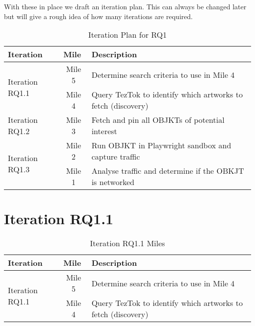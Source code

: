 With these in place we draft an iteration plan. This can always be changed later but will give a rough idea of how many iterations are required.


\begin{table}[h]
\footnotesize
\centering
\begin{tabular}{|l|c|l|}
\hline
\textbf{Iteration}        & \multicolumn{1}{l|}{\textbf{Mile}} & \textbf{Description}                                         \\ \hline
\multirow{2}{*}{Iteration RQ1.1} & Mile 5                              & Determine search criteria to use in Mile 4                   \\ \cline{2-3} 
                             & Mile 4                              & Query TezTok to identify which artworks to fetch (discovery) \\ \hline
Iteration RQ1.2                  & Mile 3                              & Fetch and pin all OBJKTs of potential interest               \\ \hline
\multirow{2}{*}{Iteration RQ1.3} & Mile 2                              & Run OBJKT in Playwright sandbox and capture traffic          \\ \cline{2-3} 
                             & Mile 1                              & Analyse traffic and determine if the OBKJT is networked      \\ \hline
\end{tabular}
\caption{Iteration Plan for RQ1}
\end{table}



\section {Iteration RQ1.1}


\begin{table}[H]
\footnotesize
\centering
\begin{tabular}{|l|c|l|}
\hline
\textbf{Iteration}        & \multicolumn{1}{l|}{\textbf{Mile}} & \textbf{Description}                                         \\ \hline
\multirow{2}{*}{Iteration RQ1.1} & Mile 5                              & Determine search criteria to use in Mile 4                   \\ \cline{2-3} 
                             & Mile 4                              & Query TezTok to identify which artworks to fetch (discovery) \\ \hline
\end{tabular}
\caption{Iteration RQ1.1 Miles}
\end{table}


